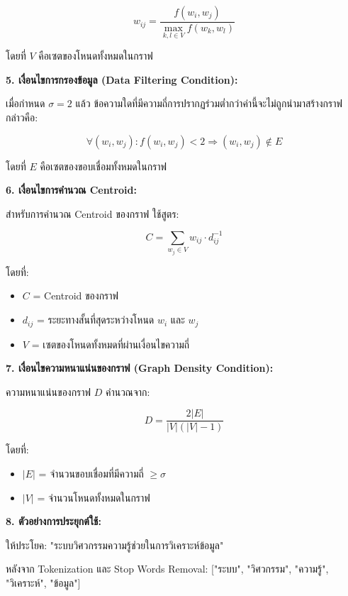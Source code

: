 \documentclass[12pt,a4paper]{article}
\begin{document}
\begin{enumerate}[leftmargin=2cm]
\begin{enumerate}
{\begin{enumerate}
            $$w_{ij} = \frac{f(w_i, w_j)}{\max_{k,l \in V} f(w_k, w_l)}$$

            โดยที่ $V$ คือเซตของโหนดทั้งหมดในกราฟ

            \textbf{5. เงื่อนไขการกรองข้อมูล (Data Filtering Condition):}

            เมื่อกำหนด $\sigma = 2$ แล้ว ข้อความใดที่มีความถี่การปรากฏร่วมต่ำกว่าค่านี้จะไม่ถูกนำมาสร้างกราฟ กล่าวคือ:

            $$\forall (w_i, w_j) : f(w_i, w_j) < 2 \Rightarrow (w_i, w_j) \notin E$$

            โดยที่ $E$ คือเซตของขอบเชื่อมทั้งหมดในกราฟ

            \textbf{6. เงื่อนไขการคำนวณ Centroid:}

            สำหรับการคำนวณ Centroid ของกราฟ ใช้สูตร:

            $$C = \sum_{w_j \in V} w_{ij} \cdot d_{ij}^{-1}$$

            โดยที่:
            \begin{itemize}
                \item $C$ = Centroid ของกราฟ
                \item $d_{ij}$ = ระยะทางสั้นที่สุดระหว่างโหนด $w_i$ และ $w_j$
                \item $V$ = เซตของโหนดทั้งหมดที่ผ่านเงื่อนไขความถี่
            \end{itemize}

            \textbf{7. เงื่อนไขความหนาแน่นของกราฟ (Graph Density Condition):}

            ความหนาแน่นของกราฟ $D$ คำนวณจาก:

            $$D = \frac{2|E|}{|V|(|V|-1)}$$

            โดยที่:
            \begin{itemize}
                \item $|E|$ = จำนวนขอบเชื่อมที่มีความถี่ $\geq \sigma$
                \item $|V|$ = จำนวนโหนดทั้งหมดในกราฟ
            \end{itemize}

            \vspace{5cm}

            \textbf{8. ตัวอย่างการประยุกต์ใช้:}

            ให้ประโยค: "ระบบวิศวกรรมความรู้ช่วยในการวิเคราะห์ข้อมูล"

            หลังจาก Tokenization และ Stop Words Removal: ["ระบบ", "วิศวกรรม", "ความรู้", "วิเคราะห์", "ข้อมูล"]


\end{enumerate}}
\end{enumerate}
\end{enumerate}
\end{document}
